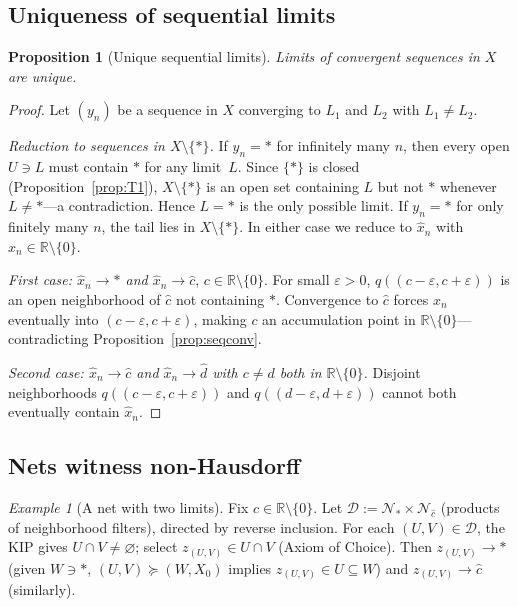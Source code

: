\documentclass[11pt]{article}
\newtheorem{proposition}[theorem]{Proposition}
\theoremstyle{definition}
\theoremstyle{remark}
\newtheorem{example}[theorem]{Example}
\begin{document}
\subsection{Uniqueness of sequential limits}

\begin{proposition}[Unique sequential limits]\label{prop:unique}
Limits of convergent sequences in $X$ are unique.
\end{proposition}
\begin{proof}
Let $(y_n)$ be a sequence in $X$ converging to $L_1$ and $L_2$ with
$L_1 \neq L_2$.

\emph{Reduction to sequences in $X \setminus \{\ast\}$.}\;
If $y_n = \ast$ for infinitely many $n$, then every open $U \ni L$
must contain $\ast$ for any limit~$L$.
Since $\{\ast\}$ is closed (Proposition~\ref{prop:T1}),
$X \setminus \{\ast\}$ is an open set containing $L$ but not $\ast$
whenever $L \neq \ast$---a contradiction.
Hence $L = \ast$ is the only possible limit.
If $y_n = \ast$ for only finitely many $n$, the tail lies in
$X \setminus \{\ast\}$.
In either case we reduce to $\hat{x}_n$ with
$x_n \in \mathbb{R}\setminus\{0\}$.

\emph{First case: $\hat{x}_n \to \ast$ and $\hat{x}_n \to \hat{c}$},
$c \in \mathbb{R}\setminus\{0\}$.\;
For small $\varepsilon > 0$,
$q((c-\varepsilon, c+\varepsilon))$ is an open neighborhood of
$\hat{c}$ not containing $\ast$.
Convergence to $\hat{c}$ forces $x_n$ eventually into
$(c-\varepsilon, c+\varepsilon)$, making $c$ an accumulation point
in $\mathbb{R}\setminus\{0\}$---contradicting
Proposition~\ref{prop:seqconv}.

\emph{Second case: $\hat{x}_n \to \hat{c}$ and $\hat{x}_n \to \hat{d}$
with $c \neq d$ both in $\mathbb{R}\setminus\{0\}$.}\;
Disjoint neighborhoods
$q((c-\varepsilon, c+\varepsilon))$ and
$q((d-\varepsilon, d+\varepsilon))$ cannot both eventually contain
$\hat{x}_n$.
\end{proof}

\subsection{Nets witness non-Hausdorff}

\begin{example}[A net with two limits]\label{ex:net}
Fix $c \in \mathbb{R}\setminus\{0\}$.
Let $\mathcal{D} := \mathcal{N}_\ast \times \mathcal{N}_{\hat{c}}$
(products of neighborhood filters), directed by reverse inclusion.
For each $(U,V) \in \mathcal{D}$, the KIP gives
$U \cap V \neq \varnothing$; select
$z_{(U,V)} \in U \cap V$ (Axiom of Choice).
Then $z_{(U,V)} \to \ast$ (given $W \ni \ast$,
$(U,V) \succeq (W, X_0)$ implies $z_{(U,V)} \in U \subseteq W$)
and $z_{(U,V)} \to \hat{c}$ (similarly).
\end{example}
\end{document}
